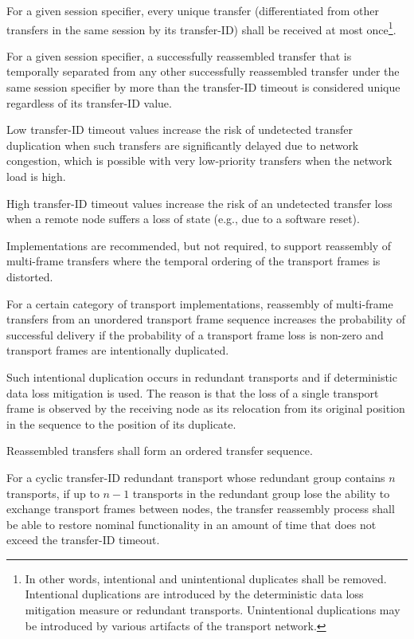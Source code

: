 For a given session specifier, every unique transfer
(differentiated from other transfers in the same session by its transfer-ID)
shall be received at most once\footnote{%
    In other words, intentional and unintentional duplicates shall be removed.
    Intentional duplications are introduced by the deterministic data loss mitigation measure or redundant transports.
    Unintentional duplications may be introduced by various artifacts of the transport network.
}.

For a given session specifier, a successfully reassembled transfer that is temporally separated from
any other successfully reassembled transfer under the same session specifier by more than the transfer-ID timeout
is considered unique regardless of its transfer-ID value.

\begin{remark}
    Low transfer-ID timeout values increase the risk of undetected transfer duplication when such transfers
    are significantly delayed due to network congestion,
    which is possible with very low-priority transfers when the network load is high.

    High transfer-ID timeout values increase the risk of an undetected transfer loss
    when a remote node suffers a loss of state (e.g., due to a software reset).
\end{remark}

Implementations are recommended, but not required, to support reassembly of
multi-frame transfers where the temporal ordering of the transport frames is distorted.

\begin{remark}
    For a certain category of transport implementations, reassembly of multi-frame transfers from an
    unordered transport frame sequence increases the probability of successful delivery if
    the probability of a transport frame loss is non-zero and transport frames are intentionally duplicated.

    Such intentional duplication occurs in redundant transports and if deterministic data loss mitigation is used.
    The reason is that the loss of a single transport frame is observed by the receiving node as its relocation
    from its original position in the sequence to the position of its duplicate.
\end{remark}

Reassembled transfers shall form an ordered transfer sequence.

For a cyclic transfer-ID redundant transport whose redundant group contains $n$ transports,
if up to $n-1$ transports in the redundant group lose the ability to exchange transport frames between nodes,
the transfer reassembly process shall be able to restore nominal functionality
in an amount of time that does not exceed the transfer-ID timeout.

